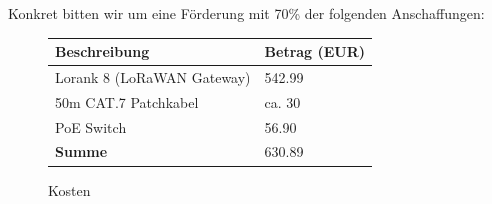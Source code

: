 \documentclass[11pt]{article}
\begin{document}
Konkret bitten wir um eine Förderung  mit 70\% der folgenden Anschaffungen:
\\
\begin{figure}[h]
	\begin{center}
		\begin{tabular}{l l}
			\textbf{Beschreibung} & \textbf{Betrag (EUR)} \\
			\hline
			Lorank 8 (LoRaWAN Gateway) & 542.99 \\
			50m CAT.7 Patchkabel & ca. 30 \\
			PoE Switch & 56.90 \\
			\hline
			\textbf{Summe} & 630.89 \\
		\end{tabular}
	\end{center}
	\label{fig:costs}
	\caption{Kosten}
\end{figure}
\end{document}
